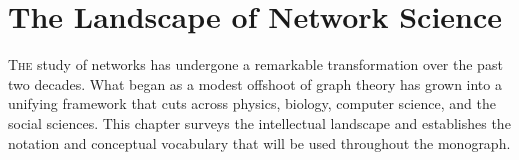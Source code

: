 \chapter{The Landscape of Network Science}

\lettrine{T}{he} study of networks has undergone a remarkable transformation over the past two decades. What began as a modest offshoot of graph theory has grown into a unifying framework that cuts across physics, biology, computer science, and the social sciences. This chapter surveys the intellectual landscape and establishes the notation and conceptual vocabulary that will be used throughout the monograph.
